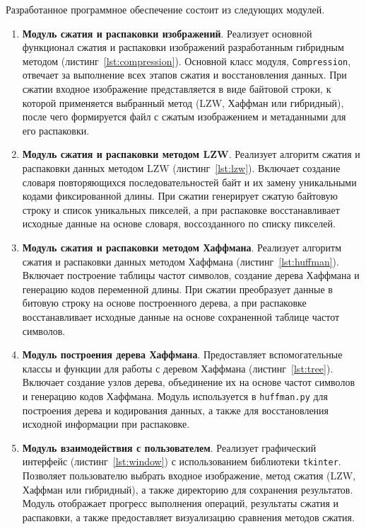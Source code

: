 Разработанное программное обеспечение состоит из следующих модулей.
\begin{enumerate}
    \item \textbf{Модуль сжатия и распаковки изображений}. Реализует основной функционал сжатия и распаковки изображений разработанным гибридным методом (листинг~\ref{lst:compression}). Основной класс модуля, \texttt{Compression}, отвечает за выполнение всех этапов сжатия и восстановления данных. При сжатии входное изображение представляется в виде байтовой строки, к которой применяется выбранный метод (LZW, Хаффман или гибридный), после чего формируется файл с сжатым изображением и метаданными для его распаковки.
    \item \textbf{Модуль сжатия и распаковки методом LZW}. Реализует алгоритм сжатия и распаковки данных методом LZW (листинг~\ref{lst:lzw}). Включает создание словаря повторяющихся последовательностей байт и их замену уникальными кодами фиксированной длины. При сжатии генерирует сжатую байтовую строку и список уникальных пикселей, а при распаковке восстанавливает исходные данные на основе словаря, воссозданного по списку пикселей.
    \item \textbf{Модуль сжатия и распаковки методом Хаффмана}. Реализует алгоритм сжатия и распаковки данных методом Хаффмана (листинг~\ref{lst:huffman}). Включает построение таблицы частот символов, создание дерева Хаффмана и генерацию кодов переменной длины. При сжатии преобразует данные в битовую строку на основе построенного дерева, а при распаковке восстанавливает исходные данные на основе сохраненной таблице частот символов.
    \item \textbf{Модуль построения дерева Хаффмана}. Предоставляет вспомогательные классы и функции для работы с деревом Хаффмана (листинг~\ref{lst:tree}). Включает создание узлов дерева, объединение их на основе частот символов и генерацию кодов Хаффмана. Модуль используется в \texttt{huffman.py} для построения дерева и кодирования данных, а также для восстановления исходной информации при распаковке.
    \item \textbf{Модуль взаимодействия с пользователем}. Реализует графический интерфейс (листинг~\ref{lst:window}) с использованием библиотеки \texttt{tkinter}. Позволяет пользователю выбрать входное изображение, метод сжатия (LZW, Хаффман или гибридный), а также директорию для сохранения результатов. Модуль отображает прогресс выполнения операций, результаты сжатия и распаковки, а также предоставляет визуализацию сравнения методов сжатия.
\end{enumerate}


